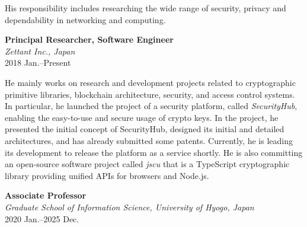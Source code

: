 \hspace*{4ex} His responsibility includes researching the wide range of security, privacy and dependability in networking and computing.
\vspace*{2ex}

\textbf{Principal Researcher, Software Engineer}\\
\hspace*{4ex}\textit{Zettant Inc., Japan}\\
\hspace*{4ex}2018 Jan.--Present

\hspace*{4ex} He mainly works on research and development projects related to cryptographic primitive libraries, blockchain architecture, security, and access control systems. In particular, he launched the project of a security platform, called \emph{SecurityHub}, enabling the easy-to-use and secure usage of crypto keys. In the project, he presented the initial concept of SecurityHub, designed its initial and detailed architectures, and has already submitted some patents. Currently, he is leading its development to release the platform as a service shortly.
He is also committing an open-source software project called \emph{jscu} that is a TypeScript cryptographic library providing unified APIs for browsers and Node.js.
\vspace*{2ex}

\textbf{Associate Professor}\\
\hspace*{4ex}\textit{Graduate School of Information Science, University of Hyogo, Japan}\\
\hspace*{4ex}2020 Jan.--2025 Dec.

